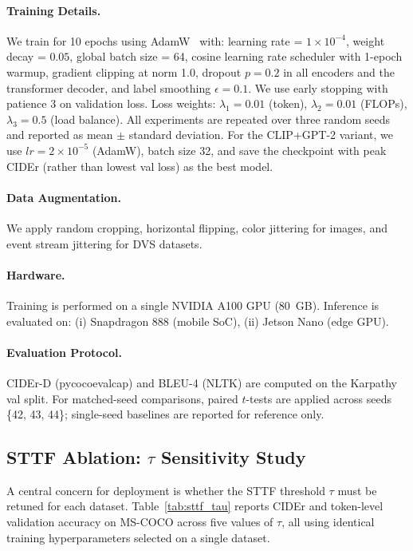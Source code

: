 \documentclass{article}
\begin{document}
\paragraph{Training Details.}
We train for 10 epochs using AdamW~\cite{loshchilov2019adamw} with:
learning rate = $1 \times 10^{-4}$,
weight decay = $0.05$,
global batch size = 64,
cosine learning rate scheduler with 1-epoch warmup,
gradient clipping at norm 1.0,
dropout $p=0.2$ in all encoders and the transformer decoder,
and label smoothing $\epsilon=0.1$.
We use early stopping with patience 3 on validation loss.
Loss weights: $\lambda_1=0.01$ (token), $\lambda_2=0.01$ (FLOPs), $\lambda_3=0.5$ (load balance).
All experiments are repeated over three random seeds and reported as mean $\pm$ standard deviation.
For the CLIP+GPT-2 variant, we use $lr{=}2{\times}10^{-5}$ (AdamW), batch size 32, and save the checkpoint with peak CIDEr (rather than lowest val loss) as the best model.

\paragraph{Data Augmentation.}
We apply random cropping, horizontal flipping, color jittering for images,
and event stream jittering for DVS datasets.
\paragraph{Hardware.}
Training is performed on a single NVIDIA A100 GPU (80~GB).
Inference is evaluated on:
(i) Snapdragon 888 (mobile SoC),
(ii) Jetson Nano (edge GPU).

\paragraph{Evaluation Protocol.}
CIDEr-D (pycocoevalcap) and BLEU-4 (NLTK) are computed on the Karpathy val split. For matched-seed comparisons, paired $t$-tests are applied across seeds \{42, 43, 44\}; single-seed baselines are reported for reference only.

\subsection{STTF Ablation: $\tau$ Sensitivity Study}

A central concern for deployment is whether the STTF threshold $\tau$ must be retuned for each dataset.
Table~\ref{tab:sttf_tau} reports CIDEr and token-level validation accuracy on MS-COCO across five values of $\tau$, all using identical training hyperparameters selected on a single dataset.
\end{document}
